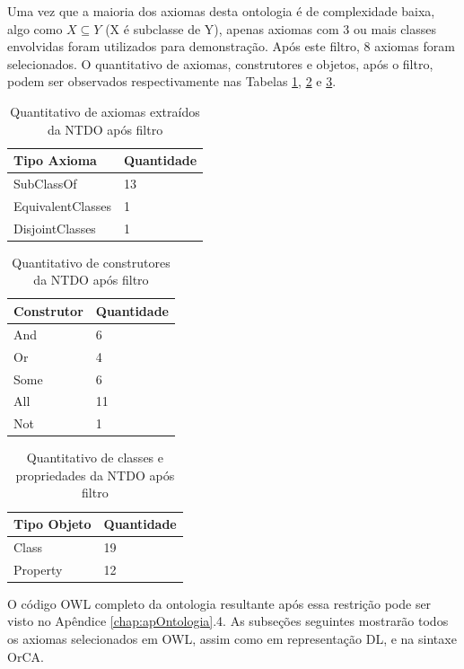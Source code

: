 \documentclass{bcc}
\begin{document}
Uma vez que a maioria dos axiomas desta ontologia é de complexidade baixa, algo como  $X \subseteq Y$ (X é subclasse de Y), apenas axiomas com 3 ou mais classes envolvidas foram utilizados para demonstração. Após este filtro, 8 axiomas foram selecionados. O quantitativo de axiomas, construtores e objetos, após o filtro, podem ser observados respectivamente nas Tabelas \ref{tab:QtdALSNTDO_filtro}, \ref{tab:QtdConstNTDO_filtro} e \ref{tab:QtdObjsNTDO_filtro}. 
\begin{table}[H]
\centering
\begin{tabular}{l|l}
Tipo Axioma       & Quantidade \\ \hline
SubClassOf        & 13         \\ \hline
EquivalentClasses & 1          \\ \hline
DisjointClasses   & 1          \\ 
\end{tabular}
\caption{Quantitativo de axiomas extraídos da NTDO após filtro}
\label{tab:QtdALSNTDO_filtro}
\end{table}

\begin{table}[H]
\centering
\begin{tabular}{l|l}
Construtor & Quantidade \\ \hline
And        & 6          \\ \hline
Or         & 4          \\ \hline
Some       & 6          \\ \hline
All        & 11         \\ \hline
Not        & 1         \\ 
\end{tabular}
\caption{Quantitativo de construtores da NTDO após filtro}
\label{tab:QtdConstNTDO_filtro}
\end{table}

\begin{table}[H]
\centering
\begin{tabular}{l|l}
Tipo Objeto   & Quantidade \\ \hline
Class         & 19         \\ \hline
Property      & 12         \\ 
\end{tabular}
\caption{Quantitativo de classes e propriedades da NTDO após filtro}
\label{tab:QtdObjsNTDO_filtro}
\end{table}

O código OWL completo da ontologia resultante após essa restrição pode ser visto no Apêndice \ref{chap:apOntologia}.4. As subseções seguintes mostrarão todos os axiomas selecionados em OWL, assim como em representação DL, e na sintaxe OrCA. 
\end{document}
